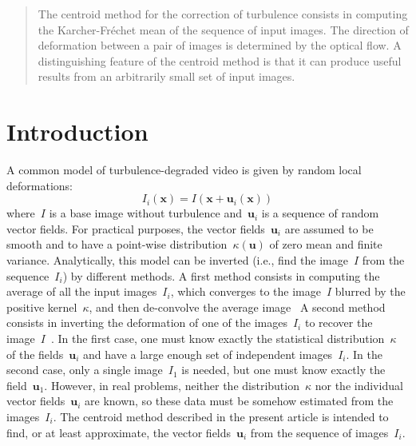 \documentclass{ipol}
\def\x{\mathbf{x}}
\def\u{\mathbf{u}}
\begin{document}
\begin{abstract}
	The centroid method for the correction of turbulence consists in computing
	the Karcher-Fréchet mean of the sequence of input images.  The direction of
	deformation between a pair of images is determined by the optical flow.
	A distinguishing feature of the centroid method is that it can produce
	useful results from an arbitrarily small set of input images.
\end{abstract}

%
%
%
%

\section{Introduction}

A common model of turbulence-degraded video is given by random local
deformations:
\begin{equation}
	I_i(\x)=I(\x+\u_i(\x))
\end{equation}
where~$I$ is a base image without turbulence and~$\u_i$ is a sequence of
random vector fields.  For practical purposes, the vector fields~$\u_i$ are
assumed to be smooth and to have a point-wise distribution~$\kappa(\u)$ of
zero mean and finite variance.  Analytically, this model can be inverted
(i.e., find the image~$I$ from the sequence~$I_i$) by different methods.
A first 
method consists in %
computing the average of all the
input images~$I_i$, which converges to the image~$I$ blurred by the positive
kernel~$\kappa$, and then de-convolve the average
image~\cite{Fried1978,getreuer2012,Gilles2012,micheli2012linear}
A second method consists in inverting the deformation of one of the
images~$I_i$ to recover the
image~$I$~\cite{frakes2001suppression,efros2005,tian2009seeing,ipol.2013.46,micheli2013}.
In the first case, one must know
exactly the statistical distribution~$\kappa$ of the fields~$\u_i$ and have a
large enough set of independent images~$I_i$.  In the second case, only a
single image~$I_1$ is needed, but one must know exactly the field~$\u_1$.  
However, in real
problems, neither the distribution~$\kappa$ nor the individual
vector fields~$\u_i$ %
are known, so these data must be somehow estimated from the images~$I_i$.  The
centroid method described in the present article is intended to find, or at
least approximate, the vector fields~$\u_i$ from the sequence of images~$I_i$.
\end{document}
